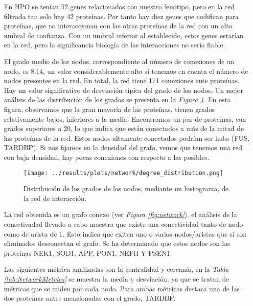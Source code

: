 En HPO se tenían 52 genes relacionados con nuestro fenotipo, pero en la red filtrada tan solo hay 42 proteínas. 
Por tanto hay diez genes que codifican para proteínas, que no interaccionan con las otras proteínas de la red con un alto umbral de confianza. 
Con un umbral inferior al establecido,  estos genes estarían en la red, pero la significancia biología de las interacciones no sería fiable.

El grado medio de los nodos, correspondiente al número de conexiones de un nodo, es 8.14, un valor considerablemente alto si tenemos en cuenta el número de nodos presentes en la red. En total, la red tiene 171 conexiones ente proteínas.
Hay un valor significativo de desviación típica del grado de los nodos. Un mejor análisis de las distribución de los grados se presenta en la \textit{Figura \ref{fig:degree}}. 
En esta figura, observamos que la gran mayoría de las proteínas, tienen grados relativamente bajos, inferiores a la media. Encontramos un par de proteínas, con grados superiores a 20, lo que indica que están conectados a más de la mitad de las proteínas de la red.
Estos nodos altamente conectados podrían ser hubs (FUS, TARDBP). %
Si nos fijamos en la densidad del grafo, vemos que tenemos una red con baja densidad, hay pocas conexiones con respecto a las posibles.


\begin{figure}[h]
	\centering
	\texttt{[image: ../results/plots/network/degree\_distribution.png]}
	\caption{Distribución de los grados de los nodos, mediante un histograma, de la red de interacción.}
	\label{fig:degree}
\end{figure}

La red obtenida es un grafo conexo (ver \textit{Figura \ref{fig:network}}), el análisis de la conectivadad llevado a cabo muestra que existe una conectividad tanto de nodo como de arista de 1.
Esto indica que exiten uno o varios nodos/aristas que si son eliminados desconectan el grafo. Se ha determinado que estos nodos son las proteínas NEK1, SOD1, APP, PON1, NEFH Y PSEN1.

Las siguientes métrica analizadas son la centralidad y cercanía, en la \textit{Tabla \ref{tab:NetworkMetrics}} se muestra la media y desviación, 
ya que se tratan de métricas que se miden por cada nodo. Para ambas métricas destaca una de las dos proteínas antes mencionadas con el grado, TARDBP.

